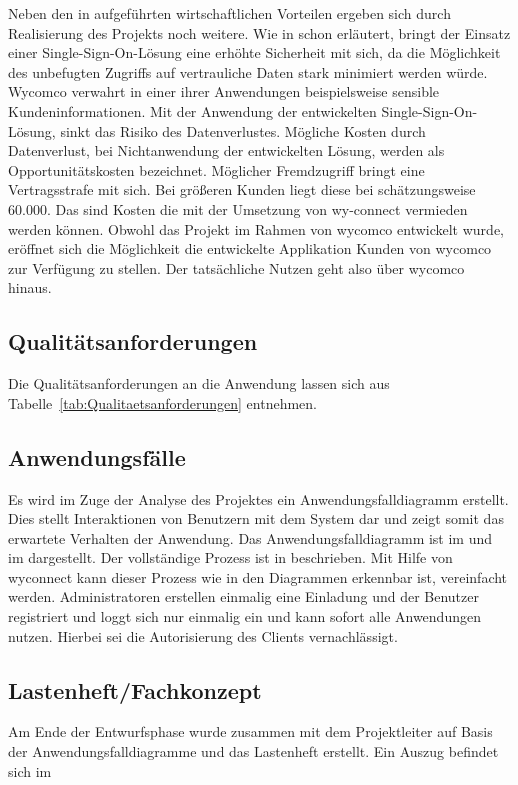 Neben den in  aufgeführten wirtschaftlichen Vorteilen ergeben sich durch Realisierung des Projekts noch weitere.
Wie in  schon erläutert, bringt der Einsatz einer Single-Sign-On-Lösung eine erhöhte Sicherheit mit sich, da die Möglichkeit des unbefugten Zugriffs auf vertrauliche Daten stark minimiert werden würde. Wycomco verwahrt in einer ihrer Anwendungen beispielsweise sensible Kundeninformationen. Mit der Anwendung der entwickelten Single-Sign-On-Lösung, sinkt das Risiko des Datenverlustes. Mögliche Kosten durch Datenverlust, bei Nichtanwendung der entwickelten Lösung, werden als  Opportunitätskosten bezeichnet. Möglicher Fremdzugriff bringt eine Vertragsstrafe mit sich. Bei größeren Kunden liegt diese bei schätzungsweise 60.000\eur{}. Das sind Kosten die mit der Umsetzung von wy-connect vermieden werden können. 
Obwohl das Projekt im Rahmen von wycomco entwickelt wurde, eröffnet sich die Möglichkeit die entwickelte Applikation  Kunden von wycomco zur Verfügung zu stellen. Der tatsächliche Nutzen geht also über wycomco hinaus.

\subsection{Qualitätsanforderungen}
\label{sec:Qualitaetsanforderungen}

Die Qualitätsanforderungen an die Anwendung lassen sich aus Tabelle~\ref{tab:Qualitaetsanforderungen} entnehmen.

\subsection{Anwendungsfälle}
\label{sec:Anwendungsfaelle}

Es wird im Zuge der Analyse des Projektes ein Anwendungsfalldiagramm erstellt. Dies stellt Interaktionen von Benutzern mit dem System dar und zeigt somit das erwartete Verhalten der Anwendung. Das Anwendungsfalldiagramm ist im  und im  dargestellt.
Der vollständige Prozess ist in  beschrieben.
Mit Hilfe von wyconnect kann dieser Prozess wie in den Diagrammen erkennbar ist, vereinfacht werden. Administratoren erstellen einmalig eine Einladung und der Benutzer registriert und loggt sich nur einmalig ein und kann sofort alle Anwendungen nutzen. Hierbei sei die Autorisierung des Clients vernachlässigt. 

\subsection{Lastenheft/Fachkonzept}
\label{sec:Lastenheft}
Am Ende der Entwurfsphase wurde zusammen mit dem Projektleiter auf Basis der Anwendungsfalldiagramme  und  das Lastenheft erstellt. Ein Auszug befindet sich im 
